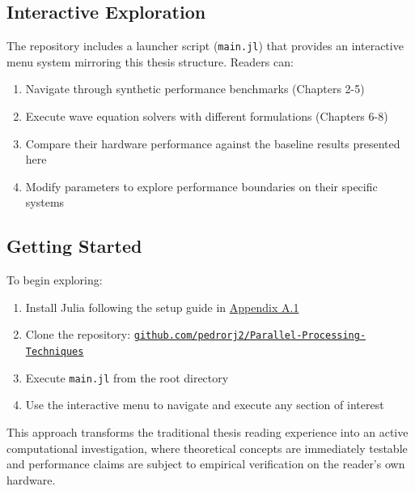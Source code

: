\subsection*{Interactive Exploration}

The repository includes a launcher script (\texttt{main.jl}) that provides an interactive menu system mirroring this thesis structure. Readers can:

\begin{enumerate}
    \item Navigate through synthetic performance benchmarks (Chapters 2-5)
    \item Execute wave equation solvers with different formulations (Chapters 6-8)
    \item Compare their hardware performance against the baseline results presented here
    \item Modify parameters to explore performance boundaries on their specific systems
\end{enumerate}

\subsection*{Getting Started}

To begin exploring:

\begin{enumerate}
    \item Install Julia following the setup guide in \hyperref[sec::JuliaSetup]{Appendix A.1}
    \item Clone the repository: \href{https://github.com/pedrorj2/Parallel-Processing-Techniques}{\texttt{github.com/pedrorj2/Parallel-Processing-Techniques}}
    \item Execute \texttt{main.jl} from the root directory
    \item Use the interactive menu to navigate and execute any section of interest
\end{enumerate}

This approach transforms the traditional thesis reading experience into an active computational investigation, where theoretical concepts are immediately testable and performance claims are subject to empirical verification on the reader's own hardware.
